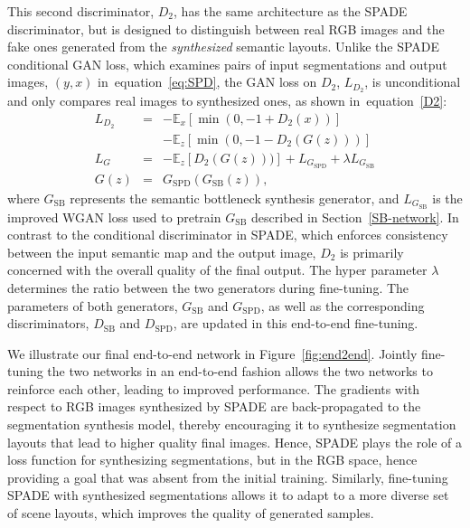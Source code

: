 \documentclass[10pt,twocolumn,letterpaper]{article}
\def\eqref#1{equation~\ref{#1}}
\begin{document}
 This second discriminator, $D_2$, has the same architecture as the SPADE discriminator, but is designed to distinguish between real RGB images and the fake ones generated from the \textit{synthesized} semantic layouts. Unlike the SPADE conditional GAN loss, which examines pairs of input segmentations and output images, $(y,x)$ in~\eqref{eq:SPD}, the GAN loss on $D_2$, $L_{D_2}$, is unconditional and only compares real images to synthesized ones, as shown in~\eqref{D2}: 
 \begin{eqnarray}
 L_{D_2} &=& -\mathbb{E}_{x} [\min(0, -1 + D_2(x))] \label{D2} \nonumber\\
 && -\mathbb{E}_{z} [\min(0, -1-D_2(G(z)))] \\
 L_G &=&  -\mathbb{E}_{z} [D_2(G(z)))] + L_{G_{\text{SPD}}} +  \lambda L_{G_{\text{SB}}} \nonumber\\
 G(z) &=& G_{\text{SPD}}(G_{\text{SB}}(z)), \nonumber
 \end{eqnarray} where $G_{\text{SB}}$ represents the semantic bottleneck synthesis generator, and $L_{G_{\text{SB}}}$ is the improved WGAN loss used to pretrain $G_{\text{SB}}$ described in Section~\ref{SB-network}.
In contrast to the conditional discriminator in SPADE, which enforces consistency between the input semantic map and the output image, $D_2$ is primarily concerned with the overall quality of the final output.
 The hyper parameter $\lambda$ determines the ratio between the two generators during fine-tuning. The parameters of both generators, $G_{\text{SB}}$ and $G_{\text{SPD}}$, as well as the corresponding discriminators, $D_{\text{SB}}$ and $D_{\text{SPD}}$, are updated in this end-to-end fine-tuning.

We illustrate our final end-to-end network in Figure~\ref{fig:end2end}.
Jointly fine-tuning the two networks in an end-to-end fashion allows the two networks to reinforce each other, leading to improved performance.
The gradients with respect to RGB images synthesized by SPADE are back-propagated to the segmentation synthesis model, thereby encouraging it to synthesize segmentation layouts that lead to higher quality final images. Hence, SPADE plays the role of a loss function for synthesizing segmentations, but in the RGB space, hence providing a goal that was absent from the initial training.
Similarly, fine-tuning SPADE with synthesized segmentations allows it to adapt to a more diverse set of scene layouts, which improves the quality of generated samples.
\end{document}
